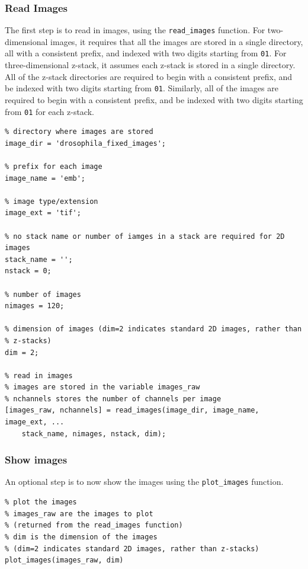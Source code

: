 \documentclass[12pt]{article}
\begin{document}
\subsubsection{Read Images}

\begin{par}
The first step is to read in images, using the \texttt{read\_images} function. For two-dimensional images, it requires that all the images are stored in a single directory, all with a consistent prefix, and indexed with two digits starting from \texttt{01}. For three-dimensional z-stack, it assumes each z-stack is stored in a single directory. All of the z-stack directories are required to begin with a consistent prefix, and be indexed with two digits starting from \texttt{01}. Similarly, all of the images are required to begin with a consistent prefix, and be indexed with two digits starting from \texttt{01} for each z-stack.
\end{par} \vspace{1em}
\begin{verbatim}
% directory where images are stored
image_dir = 'drosophila_fixed_images';

% prefix for each image
image_name = 'emb';

% image type/extension
image_ext = 'tif';

% no stack name or number of iamges in a stack are required for 2D images
stack_name = '';
nstack = 0;

% number of images
nimages = 120;

% dimension of images (dim=2 indicates standard 2D images, rather than
% z-stacks)
dim = 2;

% read in images
% images are stored in the variable images_raw
% nchannels stores the number of channels per image
[images_raw, nchannels] = read_images(image_dir, image_name, image_ext, ...
    stack_name, nimages, nstack, dim);
\end{verbatim}


\subsubsection{Show images}

\begin{par}
An optional step is to now show the images using the \texttt{plot\_images} function.
\end{par} \vspace{1em}
\begin{verbatim}
% plot the images
% images_raw are the images to plot
% (returned from the read_images function)
% dim is the dimension of the images
% (dim=2 indicates standard 2D images, rather than z-stacks)
plot_images(images_raw, dim)
\end{verbatim}
\end{document}
